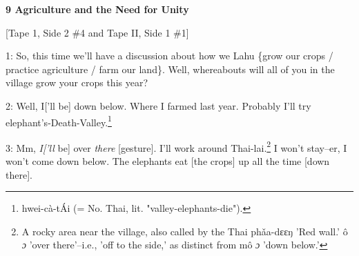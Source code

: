 
\textbf{9 Agriculture and the Need for Unity}

[Tape 1,  Side 2 \#4 and Tape II, Side 1 \#1]

1: So, this time we'll have a discussion about how we Lahu \{grow our crops / practice
agriculture / farm our land\}. Well, whereabouts will all of you in the village
grow your crops this year?

2: Well, I['ll be] down below. Where I farmed last year. Probably I'll try elephant's-Death-Valley.\footnote{hwei-cà-tÁi (= No. Thai, lit. "valley-elephants-die").}

3: Mm, \textit{I['ll} be] over \textit{there} [gesture]. I'll work around Thai-lai.\footnote{A rocky area near the village, also called by the Thai phǎa-dɛɛŋ 'Red wall.' ô \emph{ɔ} 'over there'--i.e., 'off to the side,' as distinct from mô \emph{ɔ} 'down below.'}
I won't stay--er, I won't come down below. The elephants eat [the crops] up all
the time [down there].

